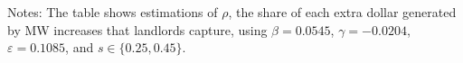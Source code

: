 \begin{table}[h!]
	\centering
	\label{tab:counterfactuals}
    \begin{minipage}{.95\textwidth} \footnotesize
		\vspace{2mm}
		Notes: The table shows estimations of $\rho$, the share of each extra dollar generated 
		by MW increases that landlords capture, using $\beta = 0.0545$, $\gamma = -0.0204$, 
		$\varepsilon = 0.1085$, and $s\in\{0.25, 0.45\}$.
    \end{minipage}
\end{table}